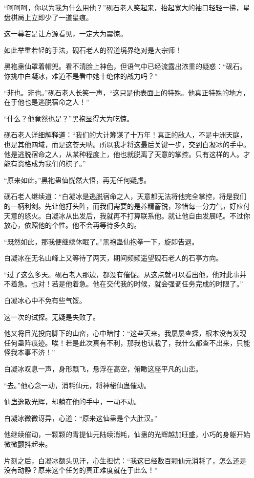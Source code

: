 \begin{this_body}
“呵呵呵，你以为我为什么用他？”砚石老人笑起来，抬起宽大的袖口轻轻一拂，星盘棋局上立即少了一道星痕。

这一幕若是让方源看见，一定大为震惊。

如此举重若轻的手法，砚石老人的智道境界绝对是大宗师！

黑袍蛊仙罩着帽兜。看不清脸上神色，但语气中已经流露出浓重的疑惑：“砚石。你挑中白凝冰，难道不是看中她十绝体的战力吗？”

“非也。非也。”砚石老人长笑一声，“这只是他表面上的特殊。他真正特殊的地方，在于他也是逃脱宿命之人！”

“什么？他竟然也是？”黑袍显得大为吃惊。

砚石老人详细解释道：“我们的大计筹谋了十万年！真正的敌人，不是中洲天庭，也是其他四域，而是这苍天呐。所以我才将这最后关键一步，交到白凝冰的手中。他是逃脱宿命之人，从某种程度上，他也就脱离了天意的掌控。只有这样的人。才能有资格成为我们的棋子。”

“原来如此。”黑袍蛊仙恍然大悟，再无任何疑虑。

砚石老人继续道：“白凝冰是逃脱宿命之人，天意都无法将他完全掌控，将是我们的一柄利剑。先让他打头阵，而我们需要的是养精蓄锐，珍惜每一分力气，好应付天意的怒火。白凝冰从出发后，我就再不打算联系他。就让他自由发展吧。不过你放心，依照他的个性。他不会再等待多久的。

“既然如此，那我便继续休眠了。”黑袍蛊仙抱拳一下，旋即告退。

白凝冰在无名山峰上又等待了两天，期间频频遥望砚石老人的石亭方向。

“过了这么多天。砚石老人那边，都没有催促。从这点就可以看出他，他对此事并不着急。也对！若是他着急。他在交代我的时候，就会强调任务完成的时限了。”

白凝冰心中不免有些气馁。

这一次的试探。无疑是失败了。

他又将目光投向脚下的山峦，心中暗忖：“这些天来。我屡屡查探，根本没有发现任何蛊阵痕迹。唉！若是此次真有不利，那我也认栽了，我什么都查不出来，只能怪我本事不济！”

白凝冰叹息一声，身形飘飞，悬浮在高空，俯瞰这座平凡的山峦。

“去。”他心念一动，消耗仙元，将神秘仙蛊催动。

仙蛊逸散光辉，却躺在他的手中，一动不动。

白凝冰微微讶异，心道：“原来这仙蛊是个大肚汉。”

他继续催动，一颗颗的青提仙元陆续消耗，仙蛊的光辉越加旺盛，小巧的身躯开始微微颤抖起来。

片刻之后，白凝冰额头见汗，心生担忧：“我这已经数百颗仙元消耗了，怎么还是没有动静？原来这个任务的真正难度就在于此么！”


\end{this_body}
